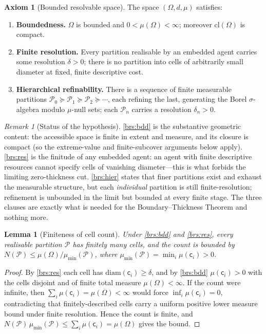 \documentclass[11pt,a4paper]{article}
\theoremstyle{thmstyle}
\newtheorem{lemma}[theorem]{Lemma}
\theoremstyle{definition}
\newtheorem{axiom}{Axiom}
\theoremstyle{remark}
\newtheorem{remark}[theorem]{Remark}
\newcommand{\Space}{\Omega}
\newcommand{\cl}{\mathrm{cl}}
\newcommand{\diam}{\mathrm{diam}}
\newcommand{\reso}{\delta}
\newcommand{\Part}{\mathscr{P}}
\newcommand{\cell}{\mathsf{c}}
\begin{document}
\begin{axiom}[Bounded resolvable space]
\label{ax:brs}
The space $(\Space,d,\mu)$ satisfies:
\begin{enumerate}[label=\textup{(BRS\arabic*)},leftmargin=3.2em]
\item\label{brs:bdd} \textbf{Boundedness.} $\Space$ is bounded and
$0<\mu(\Space)<\infty$; moreover $\cl(\Space)$ is compact.
\item\label{brs:res} \textbf{Finite resolution.} Every partition realisable by
an embedded agent carries some resolution $\reso>0$; there is no partition into
cells of arbitrarily small diameter at fixed, finite descriptive cost.
\item\label{brs:hier} \textbf{Hierarchical refinability.} There is a sequence of
finite measurable partitions $\Part_0\succeq\Part_1\succeq\Part_2\succeq\cdots$,
each refining the last, generating the Borel $\sigma$-algebra modulo $\mu$-null
sets; each $\Part_n$ carries a resolution $\reso_n>0$.
\end{enumerate}
\end{axiom}

\begin{remark}[Status of the hypothesis]
\label{rem:brs-status}
\ref{brs:bdd} is the substantive geometric content: the accessible space is
finite in extent and measure, and its closure is compact (so the
extreme-value and finite-subcover arguments below apply). \ref{brs:res} is the
finitude of any embedded agent: an agent with finite descriptive resources
cannot specify cells of vanishing diameter---this is what forbids the limiting
zero-thickness cut. \ref{brs:hier} states that finer partitions exist and
exhaust the measurable structure, but each \emph{individual} partition is still
finite-resolution; refinement is unbounded in the limit but bounded at every
finite stage. The three clauses are exactly what is needed for the
Boundary--Thickness Theorem and nothing more.
\end{remark}

\begin{lemma}[Finiteness of cell count]
\label{lem:finite-cells}
Under \ref{brs:bdd} and \ref{brs:res}, every realisable partition $\Part$ has
finitely many cells, and the count is bounded by
$N(\Part)\le \mu(\Space)/\mu_{\min}(\Part)$, where
$\mu_{\min}(\Part)=\min_i\mu(\cell_i)>0$.
\end{lemma}

\begin{proof}
By \ref{brs:res} each cell has $\diam(\cell_i)\ge\reso$, and by
\ref{brs:bdd} $\mu(\cell_i)>0$ with the cells disjoint and of finite total
measure $\mu(\Space)<\infty$. If the count were infinite, then
$\sum_i\mu(\cell_i)=\mu(\Space)<\infty$ would force
$\inf_i\mu(\cell_i)=0$, contradicting that finitely-described cells carry a
uniform positive lower measure bound under finite resolution. Hence the count
is finite, and $N(\Part)\,\mu_{\min}(\Part)\le\sum_i\mu(\cell_i)=\mu(\Space)$
gives the bound.
\end{proof}
\end{document}
